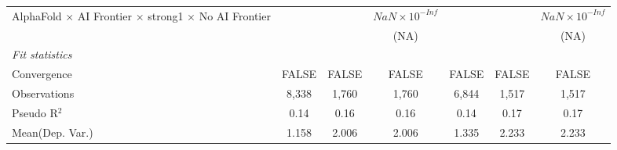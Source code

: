 \begin{tabular}{lcccccc}
   AlphaFold $\times$ AI Frontier $\times$ strong1 $\times$ No AI Frontier    &                        &                        & $NaN\times 10^{-Inf}$  &                        &                        & $NaN\times 10^{-Inf}$\\    
                                                                              &                        &                        & (NA)                   &                        &                        & (NA)\\   
   \midrule
   \emph{Fit statistics}\\
   Convergence                                                                &FALSE                   & FALSE                  & FALSE                  & FALSE                  & FALSE                  & FALSE\\  
   Observations                                                               & 8,338                  & 1,760                  & 1,760                  & 6,844                  & 1,517                  & 1,517\\  
   Pseudo R$^2$                                                               & 0.14                   & 0.16                   & 0.16                   & 0.14                   & 0.17                   & 0.17\\  
Mean(Dep. Var.) & 1.158 & 2.006 & 2.006 & 1.335 & 2.233 & 2.233 \\
   

\end{tabular}
